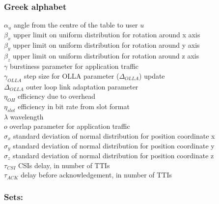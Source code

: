 \subsubsection*{Greek alphabet}

$\alpha_u$ \mytab angle from the centre of the table to user $u$\\
$\beta_x$ \mytab upper limit on uniform distribution for rotation around x axis \\
$\beta_y$ \mytab upper limit on uniform distribution for rotation around y axis \\
$\beta_z$ \mytab upper limit on uniform distribution for rotation around z axis \\
$\gamma$ \mytab burstiness parameter for application traffic\\
$\gamma_{OLLA}$ \mytab step size for OLLA parameter ($\Delta_{OLLA}$) update\\
$\Delta_{OLLA}$ \mytab outer loop link adaptation parameter\\
$\eta_{OH}$ \mytab efficiency due to overhead\\
$\eta_{slot}$ \mytab efficiency in bit rate from slot format\\
$\lambda$ \mytab wavelength\\
$o$ \mytab overlap parameter for application traffic\\
$\sigma_x$ \mytab standard deviation of normal distribution for position coordinate x \\
$\sigma_y$ \mytab standard deviation of normal distribution for position coordinate y \\
$\sigma_z$ \mytab standard deviation of normal distribution for position coordinate z \\
$\tau_{CSI}$ \mytab \acsp{CSI} delay, in number of \acsp{TTI} \\
$\tau_{ACK}$ \mytab delay before acknowledgement, in number of \acsp{TTI} \\


\subsubsection*{Sets:}

